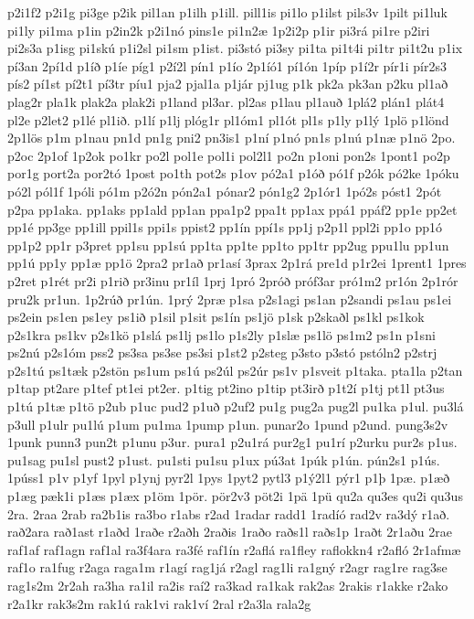 {p2i1f2
p2i1g
pi3ge
p2ik
pil1an
p1ilh
p1ill.
pill1is
pi1lo
p1ilst
pils3v
1pilt
pi1luk
pi1ly
pi1ma
p1in
p2in2k
p2i1nó
pins1e
pi1n2æ
1p2i2p
p1ir
pi3rá
pi1re
p2iri
pi2s3a
p1isg
pi1skú
p1i2sl
pi1sm
p1ist.
pi3stó
pi3sy
pi1ta
pi1t4i
pi1tr
pi1t2u
p1ix
pí3an
2pí1d
p1íð
p1íe
píg1
p2í2l
pín1
p1ío
2p1íó1
pí1ón
1píp
p1í2r
pír1i
pír2s3
pís2
pí1st
pí2t1
pí3tr
píu1
pja2
pjal1a
p1jár
pj1ug
p1k
pk2a
pk3an
p2ku
pl1að
plag2r
pla1k
plak2a
plak2i
p1land
pl3ar.
pl2as
p1lau
pl1auð
1plá2
plán1
plát4
pl2e
p2let2
p1lé
pl1ið.
p1lí
p1lj
plóg1r
pl1óm1
pl1ót
pl1s
p1ly
p1lý
1plö
p1lönd
2p1lös
p1m
p1nau
pn1d
pn1g
pni2
pn3is1
p1ní
p1nó
pn1s
p1nú
p1næ
p1nö
2po.
p2oc
2p1of
1p2ok
po1kr
po2l
pol1e
pol1i
pol2l1
po2n
p1oni
pon2s
1pont1
po2p
por1g
port2a
por2tó
1post
po1th
pot2s
p1ov
pó2a1
p1óð
pó1f
p2ók
pó2ke
1póku
pó2l
pól1f
1póli
pó1m
p2ó2n
pón2a1
pónar2
pón1g2
2p1ór1
1pó2s
póst1
2pót
p2pa
pp1aka.
pp1aks
pp1ald
pp1an
ppa1p2
ppa1t
pp1ax
ppá1
ppáf2
pp1e
pp2et
pp1é
pp3ge
pp1ill
ppil1s
ppi1s
ppist2
pp1ín
ppí1s
pp1j
p2p1l
ppl2i
pp1o
pp1ó
pp1p2
pp1r
p3pret
pp1su
pp1sú
pp1ta
pp1te
pp1to
pp1tr
pp2ug
ppu1lu
pp1un
pp1ú
pp1y
pp1æ
pp1ö
2pra2
pr1að
pr1así
3prax
2p1rá
pre1d
p1r2ei
1prent1
1pres
p2ret
p1rét
pr2i
p1rið
pr3inu
pr1íl
1prj
1pró
2próð
próf3ar
pró1m2
pr1ón
2p1rór
pru2k
pr1un.
1p2rúð
pr1ún.
1prý
2præ
p1sa
p2s1agi
ps1an
p2sandi
ps1au
ps1ei
ps2ein
ps1en
ps1ey
ps1ið
p1sil
p1sit
ps1ín
ps1jö
p1sk
p2skaðl
ps1kl
ps1kok
p2s1kra
ps1kv
p2s1kö
p1slá
ps1lj
ps1lo
p1s2ly
p1slæ
ps1lö
ps1m2
ps1n
p1sni
ps2nú
p2s1óm
pss2
ps3sa
ps3se
ps3si
p1st2
p2steg
p3sto
p3stó
pstóln2
p2strj
p2s1tú
ps1tæk
p2stön
ps1um
ps1ú
ps2úl
ps2úr
ps1v
p1sveit
p1taka.
pta1la
p2tan
p1tap
pt2are
p1tef
pt1ei
pt2er.
p1tig
pt2ino
p1tip
pt3irð
p1t2í
p1tj
pt1l
pt3us
p1tú
p1tæ
p1tö
p2ub
p1uc
pud2
p1uð
p2uf2
pu1g
pug2a
pug2l
pu1ka
p1ul.
pu3lá
p3ull
p1ulr
pu1lú
p1um
pu1ma
1pump
p1un.
punar2o
1pund
p2und.
pung3s2v
1punk
punn3
pun2t
p1unu
p3ur.
pura1
p2u1rá
pur2g1
pu1rí
p2urku
pur2s
p1us.
pu1sag
pu1sl
pust2
p1ust.
pu1sti
pu1su
p1ux
pú3at
1púk
p1ún.
pún2s1
p1ús.
1púss1
p1v
p1yf
1pyl
p1ynj
pyr2l
1pys
1pyt2
pytl3
p1ý2l1
pýr1
p1þ
1pæ.
p1æð
p1æg
pæk1i
p1æs
p1æx
p1öm
1pör.
pör2v3
pöt2i
1pä
1pü
qu2a
qu3es
qu2i
qu3us
2ra.
2raa
2rab
ra2b1is
ra3bo
r1abs
r2ad
1radar
radd1
1radíó
rad2v
ra3dý
r1að.
rað2ara
rað1ast
r1aðd
1raðe
r2aðh
2raðis
1raðo
raðs1l
raðs1p
1raðt
2r1aðu
2rae
raf1af
raf1agn
raf1al
ra3f4ara
ra3fé
raf1ín
r2aflá
ra1fley
raflokkn4
r2afló
2r1afmæ
raf1o
ra1fug
r2aga
raga1m
r1agí
rag1já
r2agl
rag1li
ra1gný
r2agr
rag1re
rag3se
rag1s2m
2r2ah
ra3ha
ra1il
ra2is
raí2
ra3kad
ra1kak
rak2as
2rakis
r1akke
r2ako
r2a1kr
rak3s2m
rak1ú
rak1vi
rak1ví
2ral
r2a3la
rala2g
}
